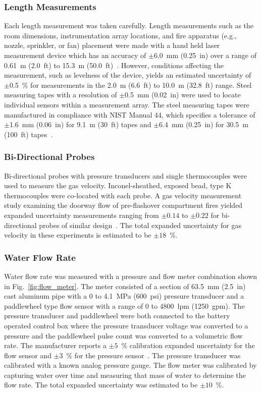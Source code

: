 \documentclass[12pt,oneside]{book}
\begin{document}
\subsubsection{Length Measurements}
Each length measurement was taken carefully. Length measurements such as the room dimensions, instrumentation array locations, and fire apparatus (e.g., nozzle, sprinkler, or fan) placement were made with a hand held laser measurement device which has an accuracy of $\pm$6.0~mm (0.25~in) over a range of 0.61~m (2.0~ft) to 15.3~m (50.0~ft)~\cite{StanleyTools}.  However, conditions affecting the measurement, such as levelness of the device, yields an estimated uncertainty of $\pm$0.5~\% for measurements in the 2.0~m (6.6~ft) to 10.0~m (32.8~ft) range. Steel measuring tapes with a resolution of $\pm$0.5~mm (0.02~in) were used to locate individual sensors within a measurement array. The steel measuring tapes were manufactured in compliance with NIST Manual 44, which specifies a tolerance of $\pm$1.6~mm (0.06~in) for 9.1~m (30~ft) tapes and $\pm$6.4~mm (0.25~in) for 30.5~m (100~ft) tapes~\cite{Butcher:2012}.

\subsubsection{Bi-Directional Probes}
Bi-directional probes with pressure transducers and single thermocouples were used to measure the gas velocity. Inconel-sheathed, exposed bead, type K thermocouples were co-located with each probe. A gas velocity measurement study examining the doorway flow of pre-flashover compartment fires yielded expanded uncertainty measurements ranging from $\pm0.14$ to $\pm0.22$ for bi-directional probes of similar design~\cite{Bryant:FSJ2009}. The total expanded uncertainty for gas velocity in these experiments is estimated to be $\pm18$~\%.   

\subsubsection{Water Flow Rate}
Water flow rate was measured with a pressure and flow meter combination shown in Fig.~\ref{fig:flow_meter}. The meter consisted of a section of 63.5~mm (2.5~in) cast aluminum pipe with a 0 to 4.1~MPa (600~psi) pressure transducer and a paddlewheel type flow sensor with a range of 0 to 4800~lpm (1250~gpm). The pressure transducer and paddlewheel were both connected to the battery operated control box where the pressure transducer voltage was converted to a pressure and the paddlewheel pulse count was converted to a volumetric flow rate. The manufacturer reports a $\pm5$~\% calibration expanded uncertainty for the flow sensor and $\pm3$~\% for the pressure sensor~\cite{Akron:2009}. The pressure transducer was calibrated with a known analog pressure gauge. The flow meter was calibrated by capturing water over time and measuring that mass of water to determine the flow rate. The total expanded uncertainty was estimated to be $\pm10$~\%. 
\end{document}
